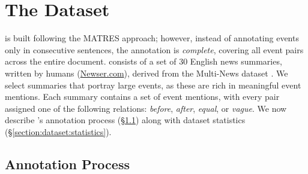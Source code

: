 \section{The \App{} Dataset}
\label{section:dataset}
\App{} is built following the MATRES \cite{ning-etal-2018-multi} approach; however, instead of annotating events only in consecutive sentences, the annotation is \textit{complete}, covering all event pairs across the entire document.
\App{} consists of a set of 30 English news summaries, written by humans (\url{Newser.com}), derived from the Multi-News dataset \cite{fabbri-etal-2019-multi}. We select summaries that portray large events, as these are rich in meaningful event mentions. Each summary contains a set of event mentions, with every pair assigned one of the following relations: \textit{before}, \textit{after}, \textit{equal}, or \textit{vague}.
We now describe \App{}'s annotation process (§\ref{section:background:annot-process}) along with dataset statistics (§\ref{section:dataset:statistics}).





\subsection{Annotation Process}
\label{section:background:annot-process}



